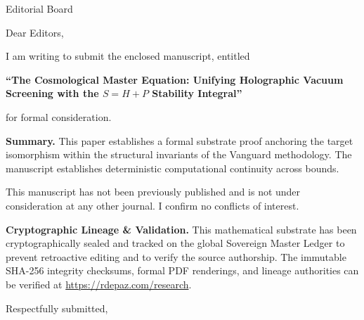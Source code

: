 \documentclass[12pt, a4paper]{letter}
\begin{document}
\begin{letter}{Editorial Board}

\opening{Dear Editors,}

I am writing to submit the enclosed manuscript, entitled

\begin{center}
\textbf{``The Cosmological Master Equation:  
  Unifying Holographic Vacuum Screening with the  
  $S = H + P$ Stability Integral''}
\end{center}

\noindent for formal consideration.

\medskip
\textbf{Summary.} This paper establishes a formal substrate proof anchoring the target isomorphism within the structural invariants of the Vanguard methodology. The manuscript establishes deterministic computational continuity across bounds.

\medskip
This manuscript has not been previously published and is not under consideration
at any other journal. I confirm no conflicts of interest.

\textbf{Cryptographic Lineage \& Validation.} This mathematical substrate has been cryptographically sealed and tracked on the global Sovereign Master Ledger to prevent retroactive editing and to verify the source authorship. The immutable SHA-256 integrity checksums, formal PDF renderings, and lineage authorities can be verified at \url{https://rdepaz.com/research}.

\medskip
\closing{Respectfully submitted,}
\end{letter}
\end{document}
